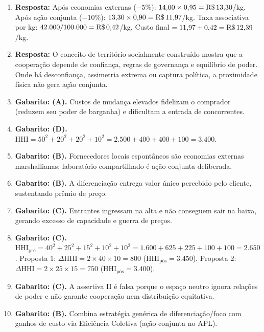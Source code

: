 \begin{boxGabarito}
\begin{enumerate}[leftmargin=1.6em, itemsep=4pt]
  \item \textbf{Resposta:} Após economias externas ($-5\%$): $14{,}00 \times 0{,}95 = \text{R\$\,}{13{,}30}$/kg. Após ação conjunta ($-10\%$): $13{,}30 \times 0{,}90 = \text{R\$\,}{11{,}97}$/kg. Taxa associativa por kg: $42.000 / 100.000 = \text{R\$\,}{0{,}42}$/kg. Custo final $= 11{,}97 + 0{,}42 = \text{R\$\,}{12{,}39}$/kg.
  \item \textbf{Resposta:} O conceito de território socialmente construído mostra que a cooperação depende de confiança, regras de governança e equilíbrio de poder. Onde há desconfiança, assimetria extrema ou captura política, a proximidade física não gera ação conjunta.
  \item \textbf{Gabarito: (A).} Custos de mudança elevados fidelizam o comprador (reduzem seu poder de barganha) e dificultam a entrada de concorrentes.
  \item \textbf{Gabarito: (D).} $\text{HHI} = 50^2 + 20^2 + 20^2 + 10^2 = 2.500 + 400 + 400 + 100 = 3.400$.
  \item \textbf{Gabarito: (B).} Fornecedores locais espontâneos são economias externas marshallianas; laboratório compartilhado é ação conjunta deliberada.
  \item \textbf{Gabarito: (B).} A diferenciação entrega valor único percebido pelo cliente, sustentando prêmio de preço.
  \item \textbf{Gabarito: (C).} Entrantes ingressam na alta e não conseguem sair na baixa, gerando excesso de capacidade e guerra de preços.
  \item \textbf{Gabarito: (C).} $\text{HHI}_{\text{pré}} = 40^2 + 25^2 + 15^2 + 10^2 + 10^2 = 1.600 + 625 + 225 + 100 + 100 = 2.650$. Proposta 1: $\Delta \text{HHI} = 2 \times 40 \times 10 = 800$ ($\text{HHI}_{\text{pós}} = 3.450$). Proposta 2: $\Delta \text{HHI} = 2 \times 25 \times 15 = 750$ ($\text{HHI}_{\text{pós}} = 3.400$).
  \item \textbf{Gabarito: (C).} A assertiva II é falsa porque o espaço neutro ignora relações de poder e não garante cooperação nem distribuição equitativa.
  \item \textbf{Gabarito: (B).} Combina estratégia genérica de diferenciação/foco com ganhos de custo via Eficiência Coletiva (ação conjunta no APL).
\end{enumerate}
\end{boxGabarito}

